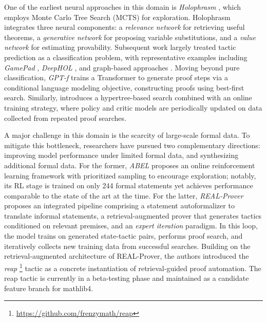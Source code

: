 \documentclass[11pt]{article}
\numberwithin{equation}{section}
\begin{document}
One of the earliest neural approaches in this domain is \textit{Holophrasm} \cite{whalen2016holophrasm}, which employs Monte Carlo Tree Search (MCTS) for exploration. Holophrasm integrates three neural components: a \textit{relevance network} for retrieving useful theorems, a \textit{generative network} for proposing variable substitutions, and a \textit{value network} for estimating provability. Subsequent work largely treated tactic prediction as a classification problem, with representative examples including \textit{GamePad} \cite{huang2018gamepad}, \textit{DeepHOL} \cite{bansal2019holist}, and graph-based approaches \cite{paliwal2020graph}. Moving beyond pure classification, \textit{GPT-f} \cite{polu2020generative} trains a Transformer to generate proof steps via a conditional language modeling objective, constructing proofs using best-first search. Similarly, \cite{lample2022hypertree} introduces a hypertree-based search combined with an online training strategy, where policy and critic models are periodically updated on data collected from repeated proof searches.

A major challenge in this domain is the scarcity of large-scale formal data. To mitigate this bottleneck, researchers have pursued two complementary directions: improving model performance under limited formal data, and synthesizing additional formal data. For the former, \textit{ABEL} \cite{gloeckle2024abel} proposes an online reinforcement learning framework with prioritized sampling to encourage exploration; notably, its RL stage is trained on only 244 formal statements yet achieves performance comparable to the state of the art at the time. For the latter, \textit{REAL-Prover} \cite{shen2025real} proposes an integrated pipeline comprising a statement autoformalizer to translate informal statements, a retrieval-augmented prover that generates tactics conditioned on relevant premises, and an \textit{expert iteration} paradigm. In this loop, the model trains on generated state-tactic pairs, performs proof search, and iteratively collects new training data from successful searches. Building on the retrieval-augmented architecture of REAL-Prover, the authors introduced the \textit{reap} \footnote{\href{https://github.com/frenzymath/reap}{https://github.com/frenzymath/reap}} tactic as a concrete instantiation of retrieval-guided proof automation. The reap tactic is currently in a beta-testing phase and maintained as a candidate feature branch for mathlib4.
\end{document}

